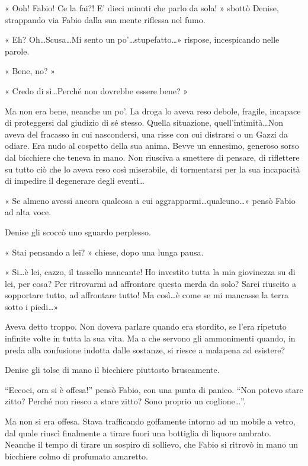 « Ooh! Fabio! Ce la fai?! E' dieci minuti che parlo da sola! » sbottò Denise, strappando via Fabio dalla sua mente riflessa nel fumo.

« Eh? Oh\ldots Scusa\ldots Mi sento un po'\ldots stupefatto\ldots » rispose, incespicando nelle parole.

« Bene, no? »

« Credo di sì\ldots Perché non dovrebbe essere bene? »

Ma non era bene, neanche un po'. La droga lo aveva reso debole, fragile, incapace di proteggersi dal giudizio di sé stesso. Quella situazione, quell'intimità\ldots Non aveva del fracasso in cui nascondersi, una risse con cui distrarsi o un Gazzi da odiare. Era nudo al cospetto della sua anima. Bevve un ennesimo, generoso sorso dal bicchiere che teneva in mano. Non riusciva a smettere di pensare, di riflettere su tutto ciò che lo aveva reso così miserabile, di tormentarsi per la sua incapacità di impedire il degenerare degli eventi\ldots

« Se almeno avessi ancora qualcosa a cui aggrapparmi\ldots qualcuno\ldots » pensò Fabio ad alta voce.

Denise gli scoccò uno sguardo perplesso.

« Stai pensando a lei? » chiese, dopo una lunga pausa.

« Si\ldots è lei, cazzo, il tassello mancante! Ho investito tutta la mia giovinezza su di lei, per cosa? Per ritrovarmi ad affrontare questa merda da solo? Sarei riuscito a sopportare tutto, ad affrontare tutto! Ma così\ldots è come se mi mancasse la terra sotto i piedi\ldots »

Aveva detto troppo. Non doveva parlare quando era stordito, se l'era ripetuto infinite volte in tutta la sua vita. Ma a che servono gli ammonimenti quando, in preda alla confusione indotta dalle sostanze, si riesce a malapena ad esistere?

Denise gli tolse di mano il bicchiere piuttosto bruscamente.

``Eccoci, ora si è offesa!'' pensò Fabio, con una punta di panico. ``Non potevo stare zitto? Perché non riesco a stare zitto? Sono proprio un coglione\ldots''.

Ma non si era offesa. Stava trafficando goffamente intorno ad un mobile a vetro, dal quale riuscì finalmente a tirare fuori una bottiglia di liquore ambrato. Neanche il tempo di tirare un sospiro di sollievo, che Fabio si ritrovò in mano un bicchiere colmo di profumato amaretto.

